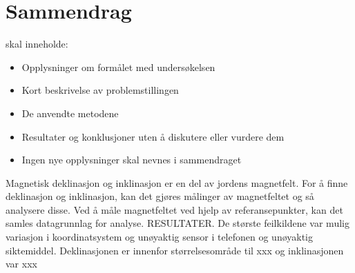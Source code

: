
\section*{Sammendrag}
skal inneholde:
\begin{itemize}
    \item Opplysninger om formålet med undersøkelsen
    \item Kort beskrivelse av problemstillingen
    \item De anvendte metodene
    \item Resultater og konklusjoner uten å diskutere eller vurdere dem
    \item Ingen nye opplysninger skal nevnes i sammendraget
\end{itemize}

Magnetisk deklinasjon og inklinasjon er en del av jordens magnetfelt. For å finne deklinasjon og inklinasjon, kan det gjøres målinger av magnetfeltet og så analysere disse. Ved å måle magnetfeltet ved hjelp av referansepunkter, kan det samles datagrunnlag for analyse. RESULTATER. De største feilkildene var mulig variasjon i koordinatsystem og unøyaktig sensor i telefonen og unøyaktig siktemiddel. Deklinasjonen er innenfor størrelsesområde til xxx og inklinasjonen var xxx  



